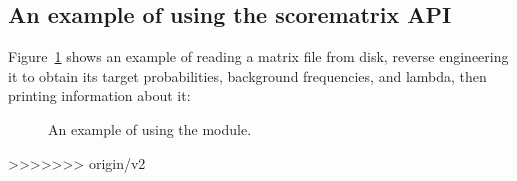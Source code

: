 \subsection{An example of using the scorematrix API}

Figure~\ref{fig:scorematrix_example} shows an example of reading a
matrix file from disk, reverse engineering it \citep{YuAltschul03} to
obtain its target probabilities, background frequencies, and lambda,
then printing information about it:

\begin{figure}

\caption{An example of using the  module.}
\label{fig:scorematrix_example}
\end{figure}
>>>>>>> origin/v2
